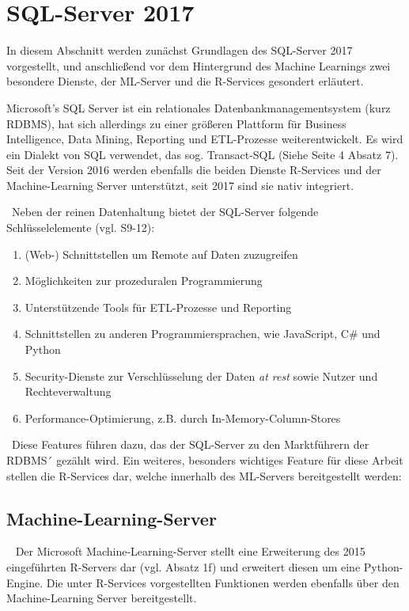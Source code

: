 \section{SQL-Server 2017}
\label{sec:SQLServer}
In diesem Abschnitt werden zunächst Grundlagen des SQL-Server 2017 vorgestellt, und anschließend vor dem Hintergrund des Machine Learnings zwei besondere Dienste, der ML-Server und die R-Services gesondert erläutert. 

Microsoft’s SQL Server ist ein relationales Datenbankmanagementsystem (kurz RDBMS), hat sich allerdings zu einer größeren Plattform für Business Intelligence, Data Mining, Reporting und ETL-Prozesse weiterentwickelt. Es wird ein Dialekt von SQL verwendet, das sog. Transact-SQL (Siehe \cite{SQLData} Seite 4 Absatz 7). Seit der Version 2016 werden ebenfalls die beiden Dienste R-Services und der Machine-Learning Server unterstützt, seit 2017 sind sie nativ integriert. 

~\newline Neben der reinen Datenhaltung bietet der SQL-Server folgende Schlüsselelemente (vgl. \cite{SQLServerWP} S9-12):
\begin{enumerate}
	\item (Web-) Schnittstellen um Remote auf Daten zuzugreifen
	\item Möglichkeiten zur prozeduralen Programmierung
	\item Unterstützende Tools für ETL-Prozesse und Reporting
	\item Schnittstellen zu anderen Programmiersprachen, wie JavaScript, C\# und Python
	\item Security-Dienste zur Verschlüsselung der Daten \textit{at rest} sowie Nutzer und Rechteverwaltung
	\item Performance-Optimierung, z.B. durch In-Memory-Column-Stores
\end{enumerate}

~\newline Diese Features führen dazu, das der SQL-Server zu den Marktführern der RDBMS´ gezählt wird. Ein weiteres, besonders wichtiges Feature für diese Arbeit stellen die R-Services dar, welche innerhalb des ML-Servers bereitgestellt werden:

\subsection{Machine-Learning-Server} ~\newline
Der Microsoft Machine-Learning-Server stellt eine Erweiterung des 2015 eingeführten R-Servers dar (vgl. \cite{MLServerInfo} Absatz 1f) und erweitert diesen um eine Python-Engine. Die unter R-Services vorgestellten Funktionen werden ebenfalls über den Machine-Learning Server bereitgestellt. 


